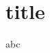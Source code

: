 \documentclass[11pt]{beamer}
\begin{document}
\section{title} 
\begin{frame}
    abc
\end{frame} 
    
\end{document}
